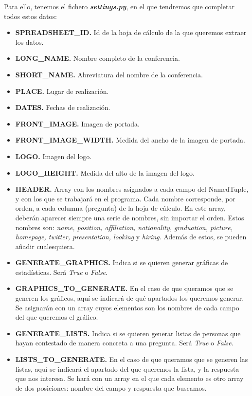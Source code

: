 \documentclass[a4paper, 12pt]{book}
\begin{document}
Para ello, tenemos el fichero \textbf{\textit{settings.py}}, en el que tendremos que completar todos estos datos:
\begin{itemize}
	\item \textbf{SPREADSHEET\_ID.} Id de la hoja de cálculo de la que queremos extraer los datos.
	\item \textbf{LONG\_NAME.} Nombre completo de la conferencia.
	\item \textbf{SHORT\_NAME.} Abreviatura del nombre de la conferencia.
	\item \textbf{PLACE.} Lugar de realización.
	\item \textbf{DATES.} Fechas de realización.
	\item \textbf{FRONT\_IMAGE.} Imagen de portada.
	\item \textbf{FRONT\_IMAGE\_WIDTH.} Medida del ancho de la imagen de portada.
	\item \textbf{LOGO.} Imagen del logo.
	\item \textbf{LOGO\_HEIGHT.} Medida del alto de la imagen del logo.
	\item \textbf{HEADER.} Array con los nombres asignados a cada campo del NamedTuple, y con los que se trabajará en el programa. Cada nombre corresponde, por orden, a cada columna (pregunta) de la hoja de cálculo. En este array, deberán aparecer siempre una serie de nombres, sin importar el orden. Estos nombres son: \textit{name, position, affiliation, nationality, graduation, picture, homepage, twitter, presentation, looking} y \textit{hiring}. Además de estos, se pueden añadir cualesquiera.
	\item \textbf{GENERATE\_GRAPHICS.} Indica si se quieren generar gráficas de estadísticas. Será \textit{True} o \textit{False}.
	\item \textbf{GRAPHICS\_TO\_GENERATE.} En el caso de que queramos que se generen los gráficos, aquí se indicará de qué apartados los queremos generar. Se asignarán con un array cuyos elementos son los nombres de cada campo del que queremos el gráfico.
	\item \textbf{GENERATE\_LISTS.} Indica si se quieren generar listas de personas que hayan contestado de manera concreta a una pregunta. Será \textit{True} o \textit{False}.
	\item \textbf{LISTS\_TO\_GENERATE.} En el caso de que queramos que se generen las listas, aquí se indicará el apartado del que queremos la lista, y la respuesta que nos interesa. Se hará con un array en el que cada elemento es otro array de dos posiciones: nombre del campo y respuesta que buscamos.
\end{itemize}
\end{document}
